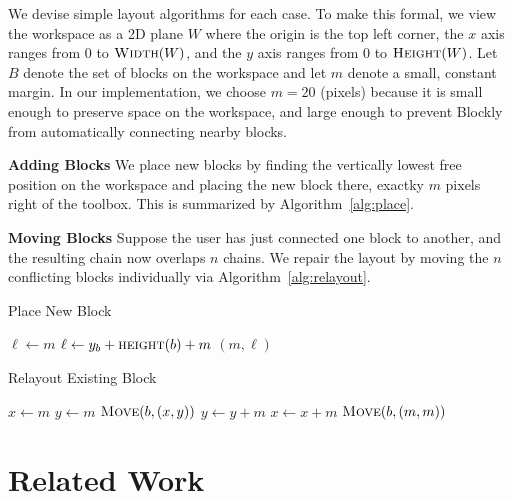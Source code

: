 \documentclass[]{article}
\begin{document}
We devise simple layout algorithms for each case. To make this formal, we view
the workspace as a 2D plane $W$ where the origin is the top left corner, the $x$ axis ranges from 0
to $\textsc{Width}(W)$, and the $y$ axis ranges from 0 to $\textsc{Height}(W)$.
Let $B$ denote the set of blocks on the workspace and let $m$ denote a small, constant margin.
In our implementation, we choose $m = 20$ (pixels) because it is small enough to preserve space
on the workspace, and large enough to prevent Blockly from automatically connecting nearby blocks.

\textbf{Adding Blocks} We place new blocks by finding the vertically lowest free
position on the workspace and placing the new block there, exactky $m$ pixels right of
the toolbox. This is summarized by Algorithm~\ref{alg:place}.

\textbf{Moving Blocks} Suppose the user has just connected one block to another, and the
resulting chain now overlaps $n$ chains. We repair the layout by moving the $n$ conflicting
blocks individually via Algorithm~\ref{alg:relayout}. 

\begin{algorithm}[H]
\caption{Place New Block}\label{alg:place}
\begin{algorithmic}
\State $\ell \gets m$ 
		\State $\ell \gets y_b + \textsc{height}(b) + m$
	\EndIf
\EndFor
\State \Return $(m, \ell)$
\EndProcedure
\end{algorithmic}
\end{algorithm}

\begin{algorithm}[H]
\caption{Relayout Existing Block}\label{alg:relayout}
\begin{algorithmic}
\State $x \gets m$
	\State $y \gets m$
				\State $\textsc{Move}(b, (x,y))$
		\EndIf
		\State $y \gets y + m$
	\EndWhile
	\State $x \gets x + m$
\EndWhile
\State $\textsc{Move}(b, (m,m))$
\EndProcedure
\end{algorithmic}
\end{algorithm}

\section{Related Work}
\end{document}
